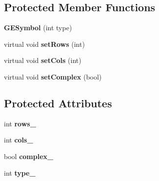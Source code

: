 \subsection*{Protected Member Functions}
\begin{DoxyCompactItemize}
\item 
\hypertarget{class_g_e_symbol_a8bec3b923598e9daab2aab824a619db5}{{\bfseries G\-E\-Symbol} (int type)}\label{class_g_e_symbol_a8bec3b923598e9daab2aab824a619db5}

\item 
\hypertarget{class_g_e_symbol_a8f5a7ba90f2d124529d6b9d7aa59cb59}{virtual void {\bfseries set\-Rows} (int)}\label{class_g_e_symbol_a8f5a7ba90f2d124529d6b9d7aa59cb59}

\item 
\hypertarget{class_g_e_symbol_a5de6b791c1f11ef2a18e5e6335f1731e}{virtual void {\bfseries set\-Cols} (int)}\label{class_g_e_symbol_a5de6b791c1f11ef2a18e5e6335f1731e}

\item 
\hypertarget{class_g_e_symbol_abc3312d19d04a1eef62c0c4d255924df}{virtual void {\bfseries set\-Complex} (bool)}\label{class_g_e_symbol_abc3312d19d04a1eef62c0c4d255924df}

\end{DoxyCompactItemize}
\subsection*{Protected Attributes}
\begin{DoxyCompactItemize}
\item 
\hypertarget{class_g_e_symbol_a36b478c80c6b652753f2b125d2de596a}{int {\bfseries rows\-\_\-}}\label{class_g_e_symbol_a36b478c80c6b652753f2b125d2de596a}

\item 
\hypertarget{class_g_e_symbol_ad6fa1f94281aebfc239e73aaefa34866}{int {\bfseries cols\-\_\-}}\label{class_g_e_symbol_ad6fa1f94281aebfc239e73aaefa34866}

\item 
\hypertarget{class_g_e_symbol_a8ad78c322adee566f1180f9d9b359798}{bool {\bfseries complex\-\_\-}}\label{class_g_e_symbol_a8ad78c322adee566f1180f9d9b359798}

\item 
\hypertarget{class_g_e_symbol_a0cc2349d51f6c7111f79755761f86f01}{int {\bfseries type\-\_\-}}\label{class_g_e_symbol_a0cc2349d51f6c7111f79755761f86f01}

\end{DoxyCompactItemize}


